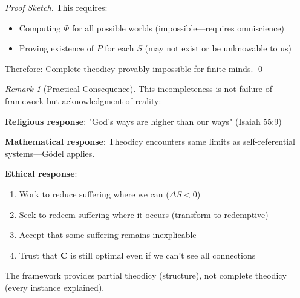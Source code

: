\documentclass[11pt,a4paper]{article}
\theoremstyle{definition}
\theoremstyle{remark}
\newtheorem{remark}{Remark}[section]
\begin{document}
\begin{small}
\begin{enumerate}
\begin{proof}[Proof Sketch]
This requires:
\begin{itemize}
    \item Computing \(\Phi\) for all possible worlds (impossible—requires omniscience)
    \item Proving existence of \(P\) for each \(S\) (may not exist or be unknowable to us)
\end{itemize}

Therefore: Complete theodicy provably impossible for finite minds. \qed
\end{proof}

\begin{remark}[Practical Consequence]
This incompleteness is not failure of framework but acknowledgment of reality:

\textbf{Religious response}: "God's ways are higher than our ways" (Isaiah 55:9)

\textbf{Mathematical response}: Theodicy encounters same limits as self-referential systems—Gödel applies.

\textbf{Ethical response}: 
\begin{enumerate}
    \item Work to reduce suffering where we can (\(\Delta S < 0\))
    \item Seek to redeem suffering where it occurs (transform to redemptive)
    \item Accept that some suffering remains inexplicable
    \item Trust that \(\mathbf{C}\) is still optimal even if we can't see all connections
\end{enumerate}

The framework provides partial theodicy (structure), not complete theodicy (every instance explained).
\end{remark}

\begin{figure}[H]
\centering
{}
\end{figure}
\end{enumerate}
\end{small}
\end{document}
